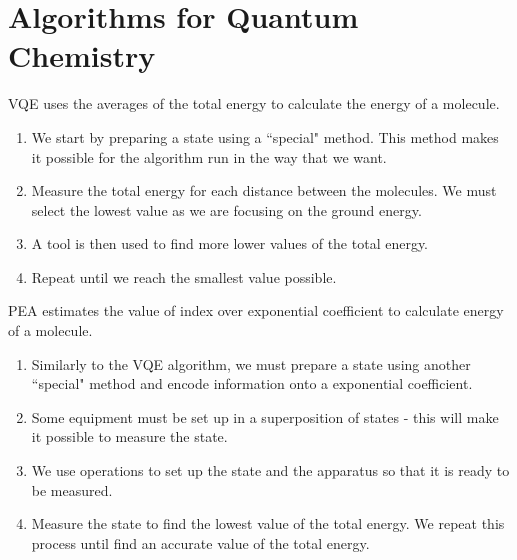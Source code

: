 \documentclass[14pt,landscape,color=UCLdarkred,margin=3cm]{uclposter}
\begin{document}
\begin{multicols}{3}
\begin{figure}[H]
   
\end{figure}

\section*{Algorithms for Quantum Chemistry}

VQE uses the averages of the total energy to calculate the energy of a molecule.

\begin{highlightbox}
  \begin{enumerate}
\item We start by preparing a state using a ``special" method. This method makes it possible for the algorithm run in the way that we want.
\item Measure the total energy for each distance between the molecules. We must select the lowest value as we are focusing on the ground energy.
\item A tool is then used to find more lower values of the total energy.
\item Repeat until we reach the smallest value possible.
\end{enumerate}
\end{highlightbox}

PEA estimates the value of index over exponential coefficient to calculate energy of a molecule.


\begin{highlightbox}
\begin{enumerate}
\item Similarly to the VQE algorithm, we must prepare a state using another ``special" method and encode information onto a exponential coefficient. 
\item Some equipment must be set up in a superposition of states - this will make it possible to measure the state.
\item We use operations to set up the state and the apparatus so that it is ready to be measured. 
\item Measure the state to find the lowest value of the total energy. We repeat this process until find an accurate value of the total energy.
\end{enumerate}
\end{highlightbox}




\end{multicols}
\end{document}
